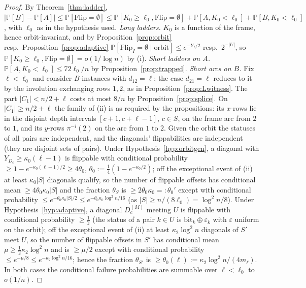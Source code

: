 \documentclass[11pt]{article}
\theoremstyle{definition}
\renewcommand{\Pr}{\mathbb{P}}
\begin{document}
\begin{proof}
By Theorem~\ref{thm:ladder},
$|\Pr[B]-\Pr[A]|\le\Pr[\mathrm{Flip}=\emptyset]\le\Pr[K_0\ge\ell_0,\mathrm{Flip}=\emptyset]+\Pr[A,K_0<\ell_0]+\Pr[B,K_0<\ell_0]$,
with $\ell_0$ as in the hypothesis used.  \emph{Long ladders.}  $K_0$ is a function of the
frame, hence orbit-invariant, and by Proposition~\ref{prop:orbit} resp.\
Proposition~\ref{prop:adaptive} $\Pr[\mathrm{Flip}_I=\emptyset\mid\text{orbit}]\le e^{-Y_I/2}$
resp.\ $2^{-|U|}$, so $\Pr[K_0\ge\ell_0,\mathrm{Flip}=\emptyset]=o(1/\log n)$ by (i).
\emph{Short ladders on $A$.}  $\Pr[A,K_0<\ell_0]\le72\ell_0/n$ by Proposition~\ref{prop:trapped}.
\emph{Short arcs on $B$.}  Fix $\ell<\ell_0$ and consider $B$-instances with $d_{12}=\ell$;
the case $d_{21}=\ell$ reduces to it by the involution exchanging rows $1,2$, as in
Proposition~\ref{prop:Lwitness}.  The part $|C_1|<n/2+\ell$ costs at most $8/n$ by
Proposition~\ref{prop:splice}.  On $|C_1|\ge n/2+\ell$ the family of (ii) is as required by
the propositions: its $x$-rows lie in the disjoint depth intervals $[c+1,c+\ell-1]$, $c\in S$,
on the frame arc from $2$ to $1$, and its $y$-rows $\pi^{-i}(2)$ on the arc from $1$ to $2$.
Given the orbit the statuses of all pairs are independent, and the diagonals'
flippabilities are independent (they are disjoint sets of pairs).  Under
Hypothesis~\ref{hyp:orbitgen}, a diagonal with $Y_{D_c}\ge\kappa_0(\ell-1)$ is flippable
with conditional probability $\ge1-e^{-\kappa_0(\ell-1)/2}\ge4\theta_0$,
$\theta_0:=\tfrac14(1-e^{-\kappa_0/2})$; off the exceptional event of (ii) at least
$\kappa_0|S|$ diagonals qualify, so the number of flippable offsets has conditional mean
$\ge4\theta_0\kappa_0|S|$ and the fraction $\theta_S$ is $\ge2\theta_0\kappa_0=:\theta_0'$
except with conditional probability $\le e^{-\theta_0\kappa_0|S|/2}\le e^{-\theta_0\kappa_0\log^2n/16}$
(as $|S|\ge n/(8\ell_0)=\log^2n/8$).
Under Hypothesis~\ref{hyp:adaptive}, a diagonal $D_c^{(M)}$ meeting $U$ is flippable with
conditional probability $\ge\tfrac12$ (the status of a pair $k\in U$ is
$\mathrm{bit}_k\oplus\varepsilon_k$ with $\varepsilon$ uniform on the orbit); off the
exceptional event of (ii) at least $\kappa_2\log^2n$ diagonals of $S'$ meet $U$, so the
number of flippable offsets in $S'$ has conditional mean $\mu\ge\tfrac12\kappa_2\log^2n$ and
is $\ge\mu/2$ except with conditional probability $\le e^{-\mu/8}\le e^{-\kappa_2\log^2n/16}$;
hence the fraction $\theta_{S'}$ is $\ge\theta_0(\ell):=\kappa_2\log^2n/(4m_\ell)$.  In both
cases the conditional failure probabilities are summable over $\ell<\ell_0$ to $o(1/n)$.

\end{proof}
\end{document}
